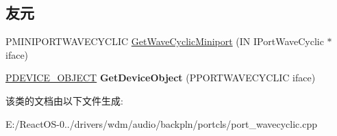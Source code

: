 \subsection*{友元}
\begin{DoxyCompactItemize}
\item 
\mbox{\label{class_c_port_wave_cyclic_ab1635d3afd07da70572a123b6c7bd716}} 
P\+M\+I\+N\+I\+P\+O\+R\+T\+W\+A\+V\+E\+C\+Y\+C\+L\+IC \hyperlink{class_c_port_wave_cyclic_ab1635d3afd07da70572a123b6c7bd716}{Get\+Wave\+Cyclic\+Miniport} (IN I\+Port\+Wave\+Cyclic $\ast$iface)
\begin{DoxyCompactList}\small\item\em 

 \end{DoxyCompactList}\item 
\mbox{\label{class_c_port_wave_cyclic_ad6ef4d5d1a104ff235852bc670ad66a5}} 
\hyperlink{struct___d_e_v_i_c_e___o_b_j_e_c_t}{P\+D\+E\+V\+I\+C\+E\+\_\+\+O\+B\+J\+E\+CT} {\bfseries Get\+Device\+Object} (P\+P\+O\+R\+T\+W\+A\+V\+E\+C\+Y\+C\+L\+IC iface)
\end{DoxyCompactItemize}


该类的文档由以下文件生成\+:\begin{DoxyCompactItemize}
\item 
E\+:/\+React\+O\+S-\/0../drivers/wdm/audio/backpln/portcls/port\+\_\+wavecyclic.\+cpp\end{DoxyCompactItemize}

